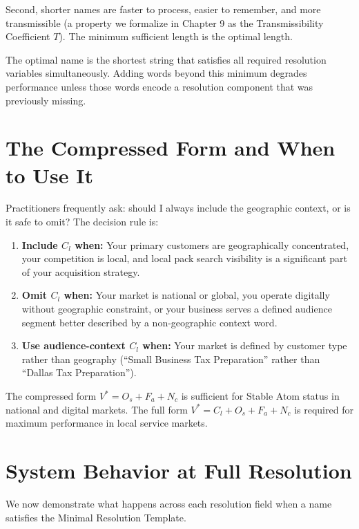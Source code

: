 \documentclass[12pt, openany]{book}
\theoremstyle{thmstyle}
\theoremstyle{defstyle}
\newcommand{\vstar}{V^{*}}
\newcommand{\Nc}{N_c}
\newcommand{\Os}{O_s}
\newcommand{\Fa}{F_a}
\newcommand{\Cl}{C_l}
\begin{document}
Second, shorter names are faster to process, easier to remember, and more transmissible (a property we formalize in Chapter 9 as the Transmissibility Coefficient $T$). The minimum sufficient length is the optimal length.

\begin{keybox}
The optimal name is the shortest string that satisfies all required resolution variables simultaneously. Adding words beyond this minimum degrades performance unless those words encode a resolution component that was previously missing.
\end{keybox}

\section{The Compressed Form and When to Use It}

Practitioners frequently ask: should I always include the geographic context, or is it safe to omit? The decision rule is:

\begin{enumerate}[leftmargin=1.5em]
  \item \textbf{Include $\Cl$ when:} Your primary customers are geographically concentrated, your competition is local, and local pack search visibility is a significant part of your acquisition strategy.
  \item \textbf{Omit $\Cl$ when:} Your market is national or global, you operate digitally without geographic constraint, or your business serves a defined audience segment better described by a non-geographic context word.
  \item \textbf{Use audience-context $\Cl$ when:} Your market is defined by customer type rather than geography (``Small Business Tax Preparation'' rather than ``Dallas Tax Preparation'').
\end{enumerate}

The compressed form $\vstar = \Os + \Fa + \Nc$ is sufficient for Stable Atom status in national and digital markets. The full form $\vstar = \Cl + \Os + \Fa + \Nc$ is required for maximum performance in local service markets.

\section{System Behavior at Full Resolution}

We now demonstrate what happens across each resolution field when a name satisfies the Minimal Resolution Template.
\end{document}
